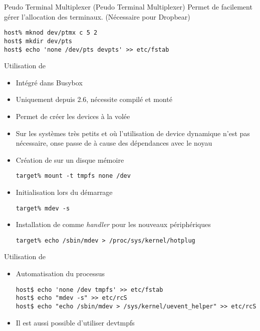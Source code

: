 \begin{frame}[fragile=singleslide]{Peudo Terminal Multiplexer}
   (Peudo  Terminal Multiplexer) Permet  de facilement gérer
  l'allocation des terminaux. (Nécessaire pour Dropbear)
  \begin{lstlisting}
host% mknod dev/ptmx c 5 2
host$ mkdir dev/pts
host$ echo 'none /dev/pts devpts' >> etc/fstab
  \end{lstlisting}
\end{frame}

\begin{frame}[fragile=singleslide]{Utilisation de }
  \begin{itemize}
  \item Intégré dans Busybox
  \item Uniquement depuis 2.6, nécessite  compilé et monté
  \item Permet de créer les devices à la volée
  \item Sur  les systèmes  très petits et  où l'utilisation  de device
    dynamique n'est  pas nécessaire, onse passe de   à cause
    des dépendances avec le noyau
  \item Création de  sur un disque mémoire
    \begin{lstlisting}
target% mount -t tmpfs none /dev
    \end{lstlisting}
  \item Initialisation  lors du démarrage
    \begin{lstlisting}
target% mdev -s
    \end{lstlisting}
  \item  Installation  de    comme \emph{handler}  pour  les
    nouveaux périphériques
    \begin{lstlisting}
target% echo /sbin/mdev > /proc/sys/kernel/hotplug
    \end{lstlisting}
  \end{itemize}
\end{frame}

\begin{frame}[fragile=singleslide]{Utilisation de }
  \begin{itemize}
  \item  Automatisation du processus
    \begin{lstlisting}
host$ echo 'none /dev tmpfs' >> etc/fstab
host$ echo "mdev -s" >> etc/rcS
host$ echo "echo /sbin/mdev > /sys/kernel/uevent_helper" >> etc/rcS
    \end{lstlisting}
  \item Il est aussi possible d'utiliser devtmpfs
  \end{itemize}
\end{frame}

